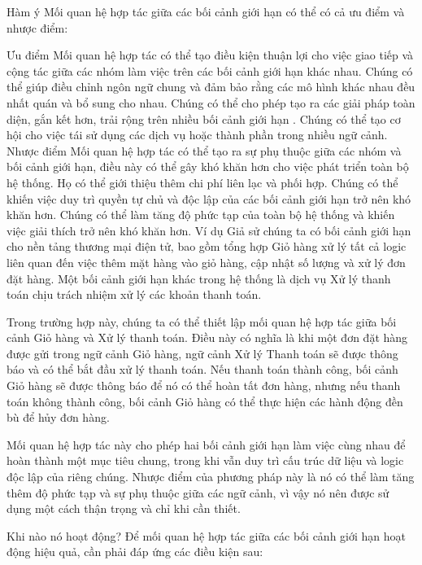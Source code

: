 Hàm ý
Mối quan hệ hợp tác giữa các bối cảnh giới hạn có thể có cả ưu điểm và nhược điểm:

Ưu điểm
Mối quan hệ hợp tác có thể tạo điều kiện thuận lợi cho việc giao tiếp và cộng tác giữa các nhóm làm việc trên các bối cảnh giới hạn khác nhau.
Chúng có thể giúp điều chỉnh ngôn ngữ chung và đảm bảo rằng các mô hình khác nhau đều nhất quán và bổ sung cho nhau.
Chúng có thể cho phép tạo ra các giải pháp toàn diện, gắn kết hơn, trải rộng trên nhiều bối cảnh giới hạn .
Chúng có thể tạo cơ hội cho việc tái sử dụng các dịch vụ hoặc thành phần trong nhiều ngữ cảnh.
Nhược điểm
Mối quan hệ hợp tác có thể tạo ra sự phụ thuộc giữa các nhóm và bối cảnh giới hạn, điều này có thể gây khó khăn hơn cho việc phát triển toàn bộ hệ thống.
Họ có thể giới thiệu thêm chi phí liên lạc và phối hợp.
Chúng có thể khiến việc duy trì quyền tự chủ và độc lập của các bối cảnh giới hạn trở nên khó khăn hơn.
Chúng có thể làm tăng độ phức tạp của toàn bộ hệ thống và khiến việc giải thích trở nên khó khăn hơn.
Ví dụ
Giả sử chúng ta có bối cảnh giới hạn cho nền tảng thương mại điện tử, bao gồm tổng hợp Giỏ hàng xử lý tất cả logic liên quan đến việc thêm mặt hàng vào giỏ hàng, cập nhật số lượng và xử lý đơn đặt hàng. Một bối cảnh giới hạn khác trong hệ thống là dịch vụ Xử lý thanh toán chịu trách nhiệm xử lý các khoản thanh toán.

Trong trường hợp này, chúng ta có thể thiết lập mối quan hệ hợp tác giữa bối cảnh Giỏ hàng và Xử lý thanh toán. Điều này có nghĩa là khi một đơn đặt hàng được gửi trong ngữ cảnh Giỏ hàng, ngữ cảnh Xử lý Thanh toán sẽ được thông báo và có thể bắt đầu xử lý thanh toán. Nếu thanh toán thành công, bối cảnh Giỏ hàng sẽ được thông báo để nó có thể hoàn tất đơn hàng, nhưng nếu thanh toán không thành công, bối cảnh Giỏ hàng có thể thực hiện các hành động đền bù để hủy đơn hàng.

Mối quan hệ hợp tác này cho phép hai bối cảnh giới hạn làm việc cùng nhau để hoàn thành một mục tiêu chung, trong khi vẫn duy trì cấu trúc dữ liệu và logic độc lập của riêng chúng. Nhược điểm của phương pháp này là nó có thể làm tăng thêm độ phức tạp và sự phụ thuộc giữa các ngữ cảnh, vì vậy nó nên được sử dụng một cách thận trọng và chỉ khi cần thiết.

Khi nào nó hoạt động?
Để mối quan hệ hợp tác giữa các bối cảnh giới hạn hoạt động hiệu quả, cần phải đáp ứng các điều kiện sau:

